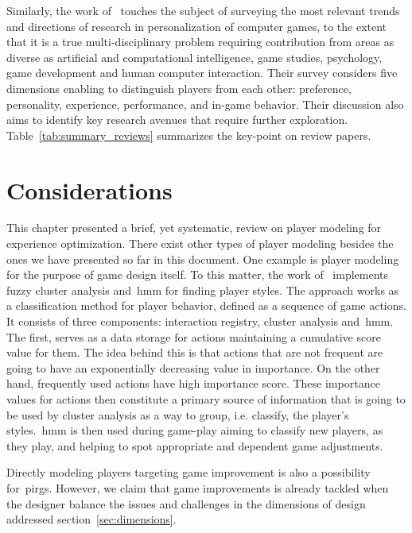 Similarly, the work of~\cite{karpinskyj_video_2014} touches the subject of surveying the most relevant trends and directions of research in personalization of computer games, to the extent that it is a true multi-disciplinary problem requiring contribution from areas as diverse as artificial and computational intelligence, game studies, psychology, game development and human computer interaction. Their survey considers five dimensions enabling to distinguish players from each other: preference, personality, experience, performance, and in-game behavior. Their discussion also aims to identify key research avenues that require further exploration. Table~\ref{tab:summary_reviews} summarizes the key-point on review papers. 


\section{Considerations}
This chapter presented a brief, yet systematic, review on player modeling for experience optimization. There exist other types of player modeling besides the ones we have presented so far in this document. One example is player modeling for the purpose of game design itself. To this matter, the work of~\cite{etheredge_generic_2013} implements fuzzy cluster analysis and~\gls{hmm} for finding player styles. The approach works as a classification method for player behavior, defined as a sequence of game actions. It consists of three components: interaction registry, cluster analysis and~\gls{hmm}. The first, serves as a data storage for actions maintaining a cumulative score value for them. The idea behind this is that actions that are not frequent are going to have an exponentially decreasing value in importance. On the other hand, frequently used actions have high importance score. These importance values for actions then constitute a primary source of information that is going to be used by cluster analysis as a way to group, i.e. classify, the player's styles.~\gls{hmm} is then used during game-play aiming to classify new players, as they play, and helping to spot appropriate and dependent game adjustments. 

Directly modeling players targeting game improvement is also a possibility for~\glspl{pirg}. However, we claim that game improvements is already tackled when the designer balance the issues and challenges in the dimensions of design addressed section~\ref{sec:dimensions}.

